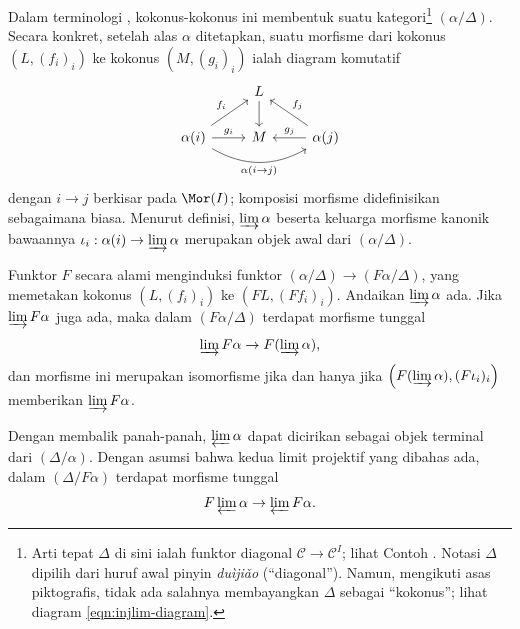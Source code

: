 Dalam terminologi \cite[\S 2.7]{Li1}, kokonus-kokonus ini membentuk suatu
kategori\footnote{Arti tepat $\Delta$ di sini ialah funktor diagonal
$\mathcal{C} \to \mathcal{C}^I$; lihat Contoh
. Notasi $\Delta$ dipilih dari huruf
awal pinyin \emph{duìjiǎo} (``diagonal''). Namun, mengikuti asas piktografis,
tidak ada salahnya membayangkan $\Delta$ sebagai ``kokonus''; lihat diagram
\eqref{eqn:injlim-diagram}.} $(\alpha / \Delta)$. Secara konkret, setelah alas
$\alpha$ ditetapkan, suatu morfisme dari kokonus $(L, (f_i)_i)$ ke kokonus
$(M, (g_i)_i)$ ialah diagram komutatif
\begin{equation}\label{eqn:injlim-diagram}\begin{tikzcd}
	& L \arrow[d] & \\
	\alpha(i) \arrow[bend right, rr, "\alpha(i \to j)"'] \arrow[r, "g_i"] \arrow[ru, "f_i"] & M & \alpha(j) \arrow[l, "{g_j}"'] \arrow[lu, "f_j"']
\end{tikzcd}\end{equation}
dengan $i \to j$ berkisar pada $\Mor(I)$; komposisi morfisme didefinisikan
sebagaimana biasa. Menurut definisi, $\varinjlim \alpha$ beserta keluarga
morfisme kanonik bawaannya
$\iota_i: \alpha(i) \to \varinjlim \alpha$ merupakan objek awal dari
$(\alpha / \Delta)$.

Funktor $F$ secara alami menginduksi funktor
$(\alpha/\Delta) \to (F\alpha / \Delta)$, yang memetakan kokonus
$(L, (f_i)_i)$ ke $(FL, (Ff_i)_i)$. Andaikan $\varinjlim \alpha$ ada. Jika
$\varinjlim F\alpha$ juga ada, maka dalam $(F\alpha / \Delta)$ terdapat
morfisme tunggal
\[ \varinjlim F\alpha \to F(\varinjlim \alpha), \]
dan morfisme ini merupakan isomorfisme jika dan hanya jika
$\left( F(\varinjlim \alpha), (F\iota_i)_i \right)$ memberikan
$\varinjlim F\alpha$.

Dengan membalik panah-panah, $\varprojlim \alpha$ dapat dicirikan sebagai
objek terminal dari $(\Delta/\alpha)$. Dengan asumsi bahwa kedua limit
projektif yang dibahas ada, dalam $(\Delta/F\alpha)$ terdapat morfisme tunggal
\[ F\varprojlim \alpha \to \varprojlim F\alpha. \]

